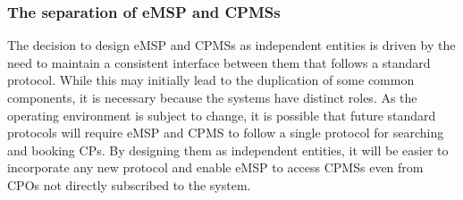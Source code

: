 \subsubsection{The separation of eMSP and CPMSs}
The decision to design eMSP and CPMSs as independent entities is driven by the need to maintain a consistent interface between them that follows a standard protocol. While this may initially lead to the duplication of some common components, it is necessary because the systems have distinct roles. As the operating environment is subject to change, it is possible that future standard protocols will require eMSP and CPMS to follow a single protocol for searching and booking CPs. By designing them as independent entities, it will be easier to incorporate any new protocol and enable eMSP to access CPMSs even from CPOs not directly subscribed to the system.